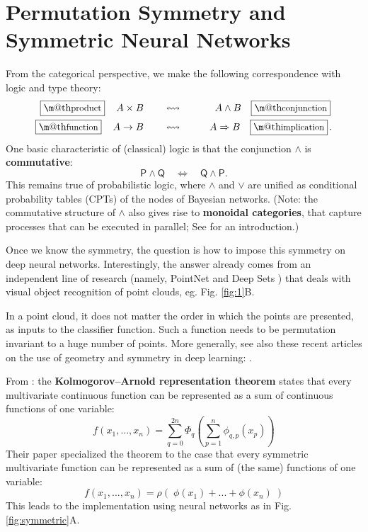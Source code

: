 \documentclass[orivec]{llncs}
\makeatletter
\renewcommand{\boxed}[1]{\fbox{\m@th$\displaystyle\scalebox{0.9}{#1}$} \,}
\makeatother
\begin{document}

\section{Permutation Symmetry and Symmetric Neural Networks}
\label{sec:commutative-structure}

From the categorical perspective, we make the following correspondence with logic and type theory:
\begin{eqnarray}
\boxed{\mbox{product}} \quad A \times B \qquad & \leftrightsquigarrow & \qquad A \wedge B \quad \boxed{\mbox{conjunction}} \nonumber \\
\boxed{\mbox{function}} \quad A \rightarrow B \qquad & \leftrightsquigarrow & \qquad A \Rightarrow B \quad \boxed{\mbox{implication}}.
\end{eqnarray}
One basic characteristic of (classical) logic is that the conjunction $\wedge$ is \textbf{commutative}:
\begin{equation}
\mathsf{P} \wedge \mathsf{Q} \quad \Leftrightarrow \quad \mathsf{Q} \wedge \mathsf{P} .
\end{equation}
This remains true of probabilistic logic, where $\wedge$ and $\vee$ are unified as conditional probability tables (CPTs) of the nodes of Bayesian networks.  (Note: the commutative structure of $\wedge$ also gives rise to \textbf{monoidal categories}, that capture processes that can be executed in parallel; See \cite{Heunen2019} for an introduction.)

Once we know the symmetry, the question is how to impose this symmetry on deep neural networks.  Interestingly, the answer already comes from an independent line of research (namely, PointNet \cite{Qi2017a} and Deep Sets \cite{Zaheer2017a}) that deals with visual object recognition of point clouds, eg. Fig. \ref{fig:1}B.

In a point cloud, it does not matter the order in which the points are presented, as inputs to the classifier function.  Such a function needs to be permutation invariant to a huge number of points.  More generally, see also these recent articles on the use of geometry and symmetry in deep learning: \cite{Bronstein2021} \cite{Bronstein2021a}.

From \cite{Zaheer2017a}: the \textbf{Kolmogorov–Arnold representation theorem} states that every multivariate continuous function can be represented as a sum of continuous functions of one variable:
\begin{equation}
f(x_1,... ,x_n) = \sum_{q=0}^{2n}\Phi_{q} \left(\sum_{p=1}^n \phi_{q,p}(x_p) \right)
\end{equation}
Their paper specialized the theorem to the case that every symmetric multivariate function can be represented as a sum of (the same) functions of one variable:
\begin{equation}
\label{symmetric-functions}
f(x_1, ..., x_n) = \rho(\; \phi(x_1) + ... + \phi(x_n) \;)
\end{equation}
This leads to the implementation using neural networks as in Fig. \ref{fig:symmetric}A.
\end{document}
